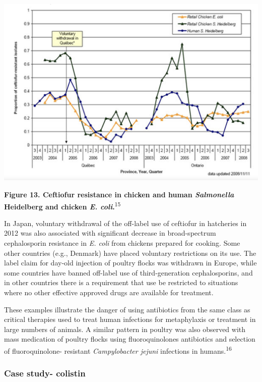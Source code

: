\documentclass[
]{book}
\begin{document}
\includegraphics[width=7.29167in,height=\textheight]{images/Canada_ecoli.png}

\textbf{Figure 13. Ceftiofur resistance in chicken and human \emph{Salmonella} Heidelberg and chicken \emph{E. coli}.}\textsuperscript{15}

In Japan, voluntary withdrawal of the off-label use of ceftiofur in hatcheries in 2012 was also associated with significant decrease in broad-spectrum cephalosporin resistance in \emph{E. coli} from chickens prepared for cooking. Some other countries (e.g., Denmark) have placed voluntary restrictions on its use. The label claim for day-old injection of poultry flocks was withdrawn in Europe, while some countries have banned off-label use of third-generation cephalosporins, and in other countries there is a requirement that use be restricted to situations where no other effective approved drugs are available for treatment.

These examples illustrate the danger of using antibiotics from the same class as critical therapies used to treat human infections for metaphylaxis or treatment in large numbers of animals. A similar pattern in poultry was also observed with mass medication of poultry flocks using fluoroquinolones antibiotics and selection of fluoroquinolone- resistant \emph{Campylobacter jejuni} infections in humans.\textsuperscript{16}

\hypertarget{case-study--colistin}{%
\subsubsection*{Case study- colistin}\label{case-study--colistin}}
\end{document}
